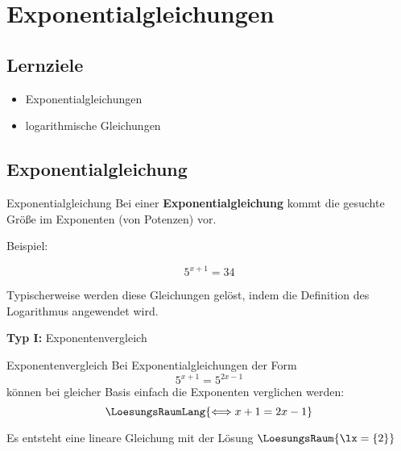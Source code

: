 
\section{Exponentialgleichungen}

\subsection*{Lernziele}

\begin{itemize}
\item Exponentialgleichungen
\item logarithmische Gleichungen 
\end{itemize}




\newpage

\subsection{Exponentialgleichung}
\begin{definition}{Exponentialgleichung}{}
  Bei einer \textbf{Exponentialgleichung} kommt die gesuchte Größe im
  Exponenten (von Potenzen) vor.
\end{definition}

Beispiel:

$$5^{x+1} = 34$$

Typischerweise werden diese Gleichungen gelöst, indem die Definition
des Logarithmus angewendet wird.

\textbf{Typ I:} Exponentenvergleich\\

\begin{rezept}{Exponentenvergleich}{}
Bei Exponentialgleichungen der Form $$5^{x+1} = 5^{2x-1}$$ können bei
gleicher Basis einfach die Exponenten verglichen werden:
$$\LoesungsRaumLang{\Longleftrightarrow x+1=2x-1}$$

Es entsteht eine lineare Gleichung mit der Lösung $\LoesungsRaum{\lx = \{2\}}$
\end{rezept}

